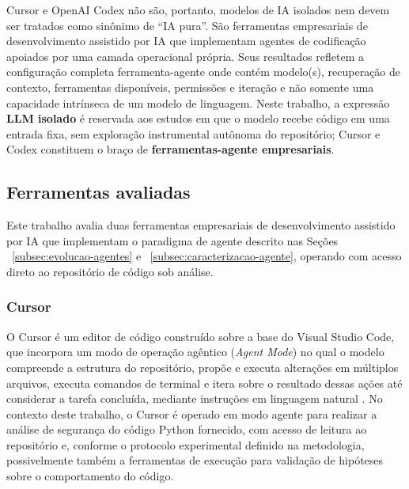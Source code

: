 Cursor e OpenAI Codex não são, portanto, modelos de IA isolados nem devem ser tratados como sinônimo de ``IA pura''. São ferramentas empresariais de desenvolvimento assistido por IA que implementam agentes de codificação apoiados por uma camada operacional própria. Seus resultados refletem a configuração completa ferramenta-agente onde contém modelo(s), recuperação de contexto, ferramentas disponíveis, permissões e iteração  e não somente uma capacidade intrínseca de um modelo de linguagem. Neste trabalho, a expressão \textbf{LLM isolado} é reservada aos estudos em que o modelo recebe código em uma entrada fixa, sem exploração instrumental autônoma do repositório; Cursor e Codex constituem o braço de \textbf{ferramentas-agente empresariais}.

\subsection{Ferramentas avaliadas}\label{subsec:ferramentas-agentes}
Este trabalho avalia duas ferramentas empresariais de desenvolvimento assistido por IA que implementam o paradigma de agente descrito nas Seções ~\ref{subsec:evolucao-agentes} e ~\ref{subsec:caracterizacao-agente}, operando com acesso direto ao repositório de código sob análise.

\subsubsection{Cursor}\label{subsubsec:cursor}
O Cursor é um editor de código construído sobre a base do Visual Studio Code, que incorpora um modo de operação agêntico (\textit{Agent Mode}) no qual o modelo compreende a estrutura do repositório, propõe e executa alterações em múltiplos arquivos, executa comandos de terminal e itera sobre o resultado dessas ações até considerar a tarefa concluída, mediante instruções em linguagem natural \cite{Cursor2025Docs}. No contexto deste trabalho, o Cursor é operado em modo agente para realizar a análise de segurança do código Python fornecido, com acesso de leitura ao repositório e, conforme o protocolo experimental definido na metodologia, possivelmente também a ferramentas de execução para validação de hipóteses sobre o comportamento do código.

